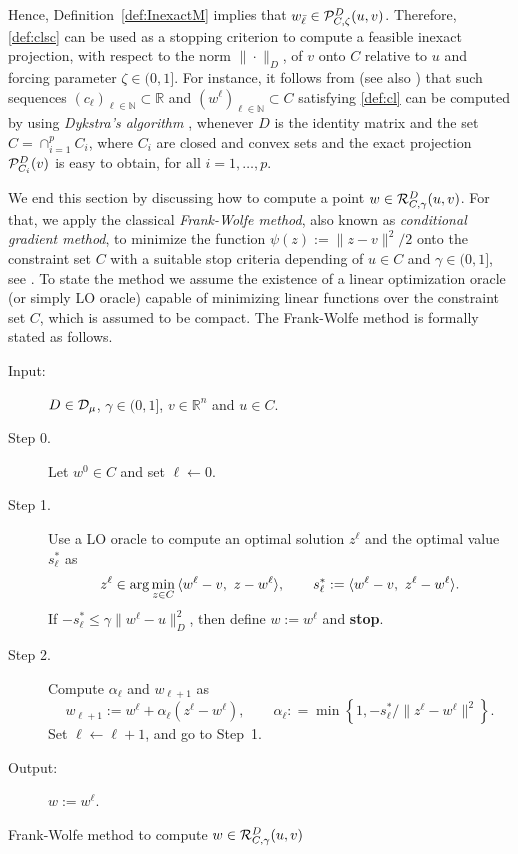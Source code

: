 Hence, Definition~\ref{def:InexactM} implies that  $w_{\bar{\ell}}\in  {\cal P}_{C, \zeta}^{D}(u, v)$.   Therefore,   \eqref{def:clsc}  can be used as a stopping criterion to compute  a  feasible inexact projection,  with respect to the norm $\| \cdot \|_{D}$,  of $v$ onto $C$ relative to $u$ and forcing parameter $\zeta\in (0, 1]$. For instance,  it follows from   \cite[Theorem~3.2, Lemma~3.1]{BirginMartinezRaydan2003} (see also \cite{BirginRaydan2005}) that  such sequences  $(c_\ell)_{\ell\in\mathbb{N}}\subset \mathbb{R}$  and   $(w^\ell)_{\ell\in\mathbb{N}}\subset C$  satisfying  \eqref{def:cl}  can be computed by using   {\it Dykstra's algorithm} \cite{Dykstra1986, Dykstra1983}, whenever  $D$ is the identity matrix  and the set $C=\cap_{i=1}^p C_i$, where $C_i$ are closed and convex sets and the exact projection  ${\cal P}_{C_i}^{D}(v)$ is easy to obtain, for all $i=1,\dots,p$.

We end this section by discussing how to compute a point $w\in{\cal R}_{C, \gamma}^{D}(u,v)$. For that, we apply the classical {\it Frank-Wolfe method}, also known as {\it conditional gradient method},   to minimize the function  $\psi(z) := \|z - v\|^2/2$ onto  the constraint set $C$ with  a suitable  stop criteria depending  of $u\in C$ and $\gamma \in (0, 1]$, see  \cite{BeckTeboulle2004, Jaggi2013}.  To state the method  we assume the existence of a linear optimization oracle (or simply LO oracle) capable of minimizing linear functions over the constraint set $C$,   which is assumed to be  compact. The   Frank-Wolfe method is  formally stated as follows.

\begin{algorithm}[H]
	\begin{description}
		\item[Input:]  $D\in {\cal D}_{\mu}$,  $\gamma \in (0, 1]$,  $v\in {\mathbb R}^n$ and   $u \in C$. 
		\item[ Step 0.] Let $w^0\in  C$ and  set $\ell \gets 0$.
		\item[ Step 1.] Use a LO oracle to compute an optimal solution $z^\ell$ and the optimal value $s_{\ell}^*$ as
			\begin{equation}\label{eq:CondG_{C}}
				z^\ell \in  \arg\min_{z \in  C} \,\langle w^\ell-v, ~z-w^\ell\rangle,  \qquad s_{\ell}^*:=\langle  w^\ell-v, ~z^\ell-w^\ell \rangle.
			\end{equation}
			If $-s^*_{\ell}\leq \gamma \|w^{\ell}-u\|_{D}^2$, then define $w:=w^\ell$ and {\bf stop}.
		\item[ Step 2.]  Compute $\alpha_\ell$ and $w_{\ell+1}$ as
			\begin{equation}\label{eq:step size}
				w_{\ell+1}:=w^\ell+ \alpha_\ell(z^\ell-w^\ell), \qquad {\alpha}_\ell: =\min\left\{1, -s^*_{\ell}/\|z^\ell-w^\ell\|^2 \right\}.
			\end{equation}
			Set $\ell\gets \ell+1$, and go to Step~1.
		\item[Output:]   $w:=w^\ell$.
	\end{description}
	\caption{Frank-Wolfe  method to compute $w\in {\cal R}_{C, \gamma}^{D}(u,v)$}
	\label{Alg:CondG}
\end{algorithm}

